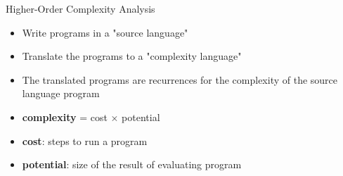 \documentclass[pdf]{beamer}
\begin{document}
\begin{frame}{Higher-Order Complexity Analysis}
  \begin{itemize}
    \item<1-> Write programs in a "source language"
    \vfill
    \item<1-> Translate the programs to a "complexity language"
    \vfill
    \item<1-> The translated programs are recurrences for the complexity of the source language program
    \vfill
    \item<1-> \textbf{complexity} = cost $\times$ potential
    \vfill
    \item<1-> \textbf{cost}: steps to run a program
    \vfill
    \item<1-> \textbf{potential}: size of the result of evaluating program
  \end{itemize}

\end{frame}
\end{document}
